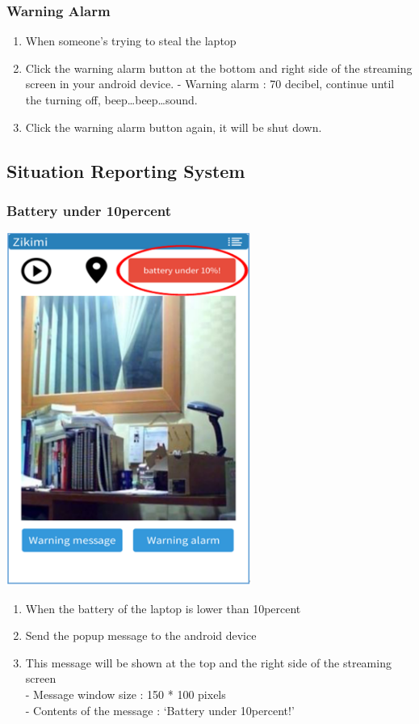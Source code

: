\documentclass[12pt]{article}
\begin{document}
\subsubsection{Warning Alarm}
\begin{enumerate}
\item When someone’s trying to steal the laptop
\item Click the warning alarm button at the bottom and right side of the streaming screen in your android device.
 - Warning alarm : 70 decibel, continue until the turning off, beep…beep…sound.
\item Click the warning alarm button again, it will be shut down.
\end{enumerate}

\subsection{Situation Reporting System}
\subsubsection{Battery under 10percent}
\begin{center} 
\includegraphics[width=80mm,scale=1.2]{battery}
\end{center}
\begin{enumerate}
\item When the battery of the laptop is lower than 10percent\\
\item Send the popup message to the android device\\
\item This message will be shown at the top and the right side of the streaming screen\\
 - Message window size : 150 * 100 pixels\\
 - Contents of the message : ‘Battery under 10percent!’\\
\end{enumerate}
\end{document}
